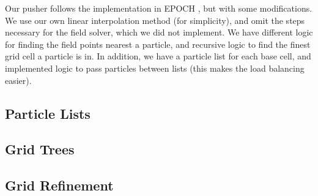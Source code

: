 \documentclass[]{article}
\begin{document}
\begin{figure}[htbp]
\label{fig:boris}
\end{figure}

Our pusher follows the implementation in EPOCH \cite{epoch}, but with some modifications.  We use our own linear interpolation method (for simplicity), and omit the steps necessary for the field solver, which we did not implement.  We have different logic for finding the field points nearest a particle, and recursive logic to find the finest grid cell a particle is in.  In addition, we have a particle list for each base cell, and implemented logic to pass particles between lists (this makes the load balancing easier).

\subsection{Particle Lists}

\subsection{Grid Trees}

\subsection{Grid Refinement}
\end{document}
